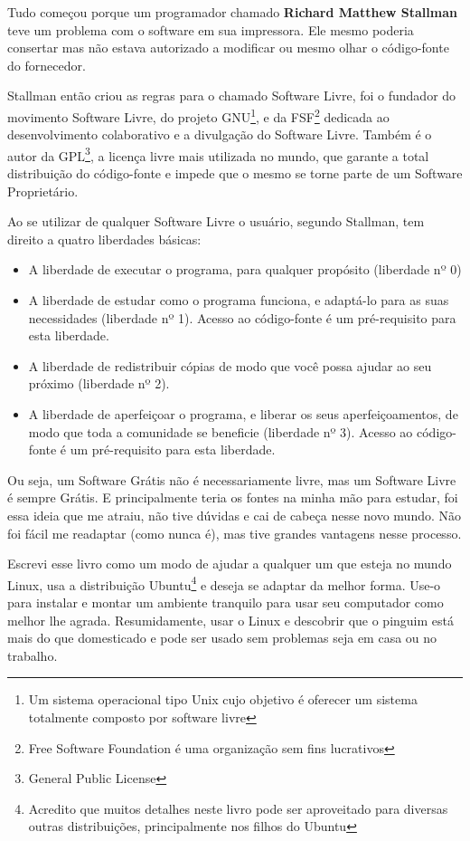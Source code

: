 Tudo começou porque um programador chamado \textbf{Richard Matthew Stallman} teve um problema com o software em sua impressora. Ele mesmo poderia consertar mas não estava autorizado a modificar ou mesmo olhar o código-fonte do fornecedor.

Stallman então criou as regras para o chamado Software Livre, foi o fundador do movimento Software Livre, do projeto GNU\footnote{Um sistema operacional tipo Unix cujo objetivo é oferecer um sistema totalmente composto por software livre}, e da FSF\footnote{Free Software Foundation é uma organização sem fins lucrativos} dedicada ao desenvolvimento colaborativo e a divulgação do Software Livre. Também é o autor da GPL\footnote{General Public License}, a licença livre mais utilizada no mundo, que garante a total distribuição do código-fonte e impede que o mesmo se torne parte de um Software Proprietário.

Ao se utilizar de qualquer Software Livre o usuário, segundo Stallman, tem direito a quatro liberdades básicas: \vspace{-1em}
\begin{itemize}[noitemsep]
 \item A liberdade de executar o programa, para qualquer propósito (liberdade nº 0)
 \item A liberdade de estudar como o programa funciona, e adaptá-lo para as suas necessidades (liberdade nº 1). Acesso ao código-fonte é um pré-requisito para esta liberdade.
 \item A liberdade de redistribuir cópias de modo que você possa ajudar ao seu próximo (liberdade nº 2).
 \item A liberdade de aperfeiçoar o programa, e liberar os seus aperfeiçoamentos, de modo que toda a comunidade se beneficie (liberdade nº 3). Acesso ao código-fonte é um pré-requisito para esta liberdade.
\end{itemize}

Ou seja, um Software Grátis não é necessariamente livre, mas um Software Livre é sempre Grátis. E principalmente teria os fontes na minha mão para estudar, foi essa ideia que me atraiu, não tive dúvidas e cai de cabeça nesse novo mundo. Não foi fácil me readaptar (como nunca é), mas tive grandes vantagens nesse processo.

Escrevi esse livro como um modo de ajudar a qualquer um que esteja no mundo Linux, usa a distribuição Ubuntu\footnote{Acredito que muitos detalhes neste livro pode ser aproveitado para diversas outras distribuições, principalmente nos filhos do Ubuntu} e deseja se adaptar da melhor forma. Use-o para instalar e montar um ambiente tranquilo para usar seu computador como melhor lhe agrada. Resumidamente, usar o Linux e descobrir que o pinguim está mais do que domesticado e pode ser usado sem problemas seja em casa ou no trabalho.

